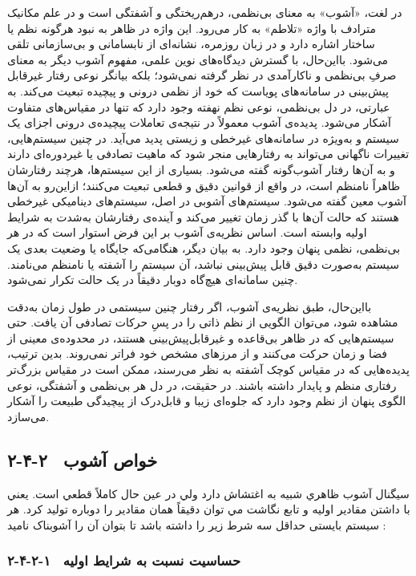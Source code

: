 در لغت، «آشوب» به معنای بی‌نظمی، درهم‌ریختگی و آشفتگی است و در علم مکانیک مترادف با واژه «تلاطم» به کار می‌رود. این واژه در ظاهر به نبود هرگونه نظم یا ساختار اشاره دارد و در زبان روزمره، نشانه‌ای از نابسامانی و بی‌سازمانی تلقی می‌شود. بااین‌حال، با گسترش دیدگاه‌های نوین علمی، مفهوم آشوب دیگر به معنای صرفِ بی‌نظمی و ناکارآمدی در نظر گرفته نمی‌شود؛ بلکه بیانگر نوعی رفتار غیرقابل پیش‌بینی در سامانه‌های پویاست که خود از نظمی درونی و پیچیده تبعیت می‌کند. به عبارتی، در دل بی‌نظمی، نوعی نظم نهفته وجود دارد که تنها در مقیاس‌های متفاوت آشکار می‌شود. پدیده‌ی آشوب معمولاً در نتیجه‌ی تعاملات پیچیده‌ی درونی اجزای یک سیستم و به‌ویژه در سامانه‌های غیرخطی و زیستی پدید می‌آید. در چنین سیستم‌هایی، تغییرات ناگهانی می‌تواند به رفتارهایی منجر شود که ماهیت تصادفی یا غیر‌دوره‌ای دارند و به آن‌ها رفتار آشوب‌گونه گفته می‌شود. بسیاری از این سیستم‌ها، هرچند رفتارشان ظاهراً نامنظم است، در واقع از قوانین دقیق و قطعی تبعیت می‌کنند؛ ازاین‌رو به آن‌ها آشوب معین گفته می‌شود. سیستم‌های آشوبی در اصل، سیستم‌های دینامیکی غیرخطی هستند که حالت آن‌ها با گذر زمان تغییر می‌کند و آینده‌ی رفتارشان به‌شدت به شرایط اولیه وابسته است. اساس نظریه‌ی آشوب بر این فرض استوار است که در هر بی‌نظمی، نظمی پنهان وجود دارد. به بیان دیگر، هنگامی‌که جایگاه یا وضعیت بعدی یک سیستم به‌صورت دقیق قابل پیش‌بینی نباشد، آن سیستم را آشفته یا نامنظم می‌نامند. چنین سامانه‌ای هیچ‌گاه دوبار دقیقاً در یک حالت تکرار نمی‌شود.

بااین‌حال، طبق نظریه‌ی آشوب، اگر رفتار چنین سیستمی در طول زمان به‌دقت مشاهده شود، می‌توان الگویی از نظم ذاتی را در پسِ حرکات تصادفی آن یافت. حتی سیستم‌هایی که در ظاهر بی‌قاعده و غیرقابل‌پیش‌بینی هستند، در محدوده‌ی معینی از فضا و زمان حرکت می‌کنند و از مرزهای مشخص خود فراتر نمی‌روند. بدین ترتیب، پدیده‌هایی که در مقیاس کوچک آشفته به نظر می‌رسند، ممکن است در مقیاس بزرگ‌تر رفتاری منظم و پایدار داشته باشند. در حقیقت، در دل هر بی‌نظمی و آشفتگی، نوعی الگوی پنهان از نظم وجود دارد که جلوه‌ای زیبا و قابل‌درک از پیچیدگی طبیعت را آشکار می‌سازد\cite{ref46}.

\subsection{۲-۴-۲  خواص آشوب}

سيگنال آشوب ظاهري شبيه به اغتشاش  دارد ولي در عين حال كاملاً قطعي است. يعني با داشتن مقادير اوليه و تابع نگاشت مي توان دقيقاً همان مقادير را دوباره توليد كرد. هر سیستم بایستی حداقل سه شرط زیر را داشته باشد تا بتوان آن را آشوبناک نامید \cite{ref21}:

\subsubsection{۲-۴-۲-۱  حساسیت نسبت به شرایط اولیه}


